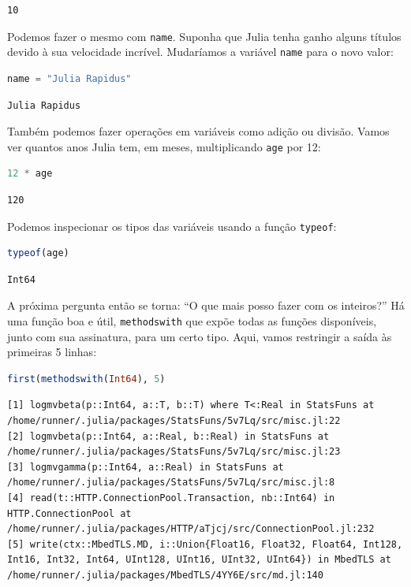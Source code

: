 \documentclass[
  notoc %
]{tufte-book}
\newcommand{\passthrough}[1]{#1}
\begin{document}
\begin{lstlisting}[language=Output]
10
\end{lstlisting}

Podemos fazer o mesmo com \passthrough{\lstinline!name!}. Suponha que
Julia tenha ganho alguns títulos devido à sua velocidade incrível.
Mudaríamos a variável \passthrough{\lstinline!name!} para o novo valor:

\begin{lstlisting}[language=Julia]
name = "Julia Rapidus"
\end{lstlisting}

\begin{lstlisting}[language=Output]
Julia Rapidus
\end{lstlisting}

Também podemos fazer operações em variáveis como adição ou divisão.
Vamos ver quantos anos Julia tem, em meses, multiplicando
\passthrough{\lstinline!age!} por 12:

\begin{lstlisting}[language=Julia]
12 * age
\end{lstlisting}

\begin{lstlisting}[language=Output]
120
\end{lstlisting}

Podemos inspecionar os tipos das variáveis usando a função
\passthrough{\lstinline!typeof!}:

\begin{lstlisting}[language=Julia]
typeof(age)
\end{lstlisting}

\begin{lstlisting}[language=Output]
Int64
\end{lstlisting}

A próxima pergunta então se torna: ``O que mais posso fazer com os
inteiros?'' Há uma função boa e útil,
\passthrough{\lstinline!methodswith!} que expõe todas as funções
disponíveis, junto com sua assinatura, para um certo tipo. Aqui, vamos
restringir a saída às primeiras 5 linhas:

\begin{lstlisting}[language=Julia]
first(methodswith(Int64), 5)
\end{lstlisting}

\begin{lstlisting}[language=Output]
[1] logmvbeta(p::Int64, a::T, b::T) where T<:Real in StatsFuns at /home/runner/.julia/packages/StatsFuns/5v7Lq/src/misc.jl:22
[2] logmvbeta(p::Int64, a::Real, b::Real) in StatsFuns at /home/runner/.julia/packages/StatsFuns/5v7Lq/src/misc.jl:23
[3] logmvgamma(p::Int64, a::Real) in StatsFuns at /home/runner/.julia/packages/StatsFuns/5v7Lq/src/misc.jl:8
[4] read(t::HTTP.ConnectionPool.Transaction, nb::Int64) in HTTP.ConnectionPool at /home/runner/.julia/packages/HTTP/aTjcj/src/ConnectionPool.jl:232
[5] write(ctx::MbedTLS.MD, i::Union{Float16, Float32, Float64, Int128, Int16, Int32, Int64, UInt128, UInt16, UInt32, UInt64}) in MbedTLS at /home/runner/.julia/packages/MbedTLS/4YY6E/src/md.jl:140
\end{lstlisting}
\end{document}
